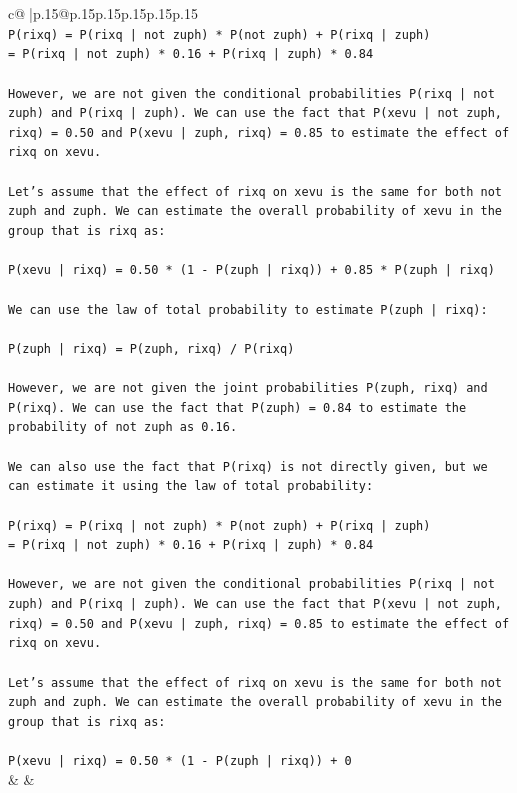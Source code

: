 \documentclass{article}
\begin{document}
{\begin{supertabular}{c@{$\;$}|p{.15\linewidth}@{}p{.15\linewidth}p{.15\linewidth}p{.15\linewidth}p{.15\linewidth}p{.15\linewidth}}
{{{\\ 
\texttt{P(rixq) = P(rixq | not zuph) * P(not zuph) + P(rixq | zuph)} \\
\texttt{= P(rixq | not zuph) * 0.16 + P(rixq | zuph) * 0.84} \\
\\ 
\texttt{However, we are not given the conditional probabilities P(rixq | not zuph) and P(rixq | zuph). We can use the fact that P(xevu | not zuph, rixq) = 0.50 and P(xevu | zuph, rixq) = 0.85 to estimate the effect of rixq on xevu.} \\
\\ 
\texttt{Let's assume that the effect of rixq on xevu is the same for both not zuph and zuph. We can estimate the overall probability of xevu in the group that is rixq as:} \\
\\ 
\texttt{P(xevu | rixq) = 0.50 * (1 {-} P(zuph | rixq)) + 0.85 * P(zuph | rixq)} \\
\\ 
\texttt{We can use the law of total probability to estimate P(zuph | rixq):} \\
\\ 
\texttt{P(zuph | rixq) = P(zuph, rixq) / P(rixq)} \\
\\ 
\texttt{However, we are not given the joint probabilities P(zuph, rixq) and P(rixq). We can use the fact that P(zuph) = 0.84 to estimate the probability of not zuph as 0.16.} \\
\\ 
\texttt{We can also use the fact that P(rixq) is not directly given, but we can estimate it using the law of total probability:} \\
\\ 
\texttt{P(rixq) = P(rixq | not zuph) * P(not zuph) + P(rixq | zuph)} \\
\texttt{= P(rixq | not zuph) * 0.16 + P(rixq | zuph) * 0.84} \\
\\ 
\texttt{However, we are not given the conditional probabilities P(rixq | not zuph) and P(rixq | zuph). We can use the fact that P(xevu | not zuph, rixq) = 0.50 and P(xevu | zuph, rixq) = 0.85 to estimate the effect of rixq on xevu.} \\
\\ 
\texttt{Let's assume that the effect of rixq on xevu is the same for both not zuph and zuph. We can estimate the overall probability of xevu in the group that is rixq as:} \\
\\ 
\texttt{P(xevu | rixq) = 0.50 * (1 {-} P(zuph | rixq)) + 0} \\
            }
        }
    }
    & & \\ \\


\end{supertabular}}
\end{document}
